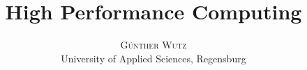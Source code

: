 \documentclass[a4paper, 10pt, DIV12, twoside]{scrartcl}
\title{\vspace{-15mm}%
	\fontsize{24pt}{10pt}\selectfont
	\textbf{High Performance Computing}
	}
\author{%
	\large
	\textsc{Günther Wutz} \\[2mm]
	\normalsize	University of Applied Sciences, Regensburg\\
	\vspace{-5mm}
	}
\date{}
\begin{document}
\maketitle
\newpage
\twocolumn
    

\end{document}
